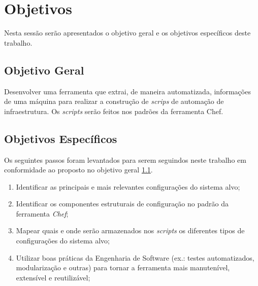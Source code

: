 \section{Objetivos}
\label{sec:obj}

Nesta sessão serão apresentados o objetivo geral e os objetivos específicos
deste trabalho.

\subsection{Objetivo Geral}
\label{sec:obj-grl}

Desenvolver uma ferramenta que extrai, de maneira automatizada, informações
de uma máquina para realizar a construção de \textit{scrips} de automação
de infraestrutura. Os \textit{scripts} serão feitos nos padrões da ferramenta
Chef.

\subsection{Objetivos Específicos}
\label{sec:obj-esp}

Os seguintes passos foram levantados para serem seguindos neste trabalho
em conformidade ao proposto no objetivo geral \ref{sec:obj-grl}.

\begin{enumerate}
  \item Identificar as principais e mais relevantes configurações do sistema
  alvo;
  \item Identificar os componentes estruturais de configuração no padrão da
    ferramenta \textit{Chef};
  \item Mapear quais e onde serão armazenados nos \textit{scripts} os
  diferentes tipos de configurações do sistema alvo;
  \item Utilizar boas práticas da Engenharia de Software (ex.: testes
  automatizados, modularização e outras) para tornar a ferramenta mais
  manutenível, extensível e reutilizável;
\end{enumerate}
